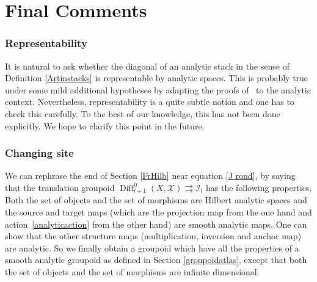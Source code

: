\documentclass[10pt]{amsart}
\let\mathcal\mathscr
\DeclareMathOperator{\Diff}{Diff}
\theoremstyle{plain}
\theoremstyle{definition}
\theoremstyle{remark}
\numberwithin{equation}{section}
\newcommand{\cI}{\mathcal{I}}
\begin{document}
\section{Final Comments}
\label{secfinalcomments}
\subsubsection*{Representability} It is natural to ask whether the diagonal of an analytic stack in the sense of Definition \ref{Artinstacks} is representable by analytic spaces. This is probably true under some mild additional hypotheses by adapting the proofs of~\cite[Props.\,15.5\,\&\,15.18]{BCEFFGK} to the analytic context. Nevertheless, representability is a quite subtle notion and one has to check this carefully. To the best of our knowledge, this has not been done explicitly. We hope to clarify this point in the future.

\subsubsection*{Changing site} We can rephrase the end of Section \ref{FrHilb} near equation \eqref{J rond}, by saying that the translation groupoid $\Diff^0_{l+1} (X,\mathcal X)\rightrightarrows \cI_l$ has the following properties. Both the set of objects and the set of morphisms are Hilbert analytic spaces and the source and target maps (which are the projection map from the one hand and action~\eqref{analyticaction} from the other hand) are smooth analytic maps. One can show that the other structure maps (multiplication, inversion and anchor map) are analytic. So we finally obtain a groupoid which have all the properties of a smooth analytic groupoid as defined in Section \ref{groupoidatlas}, except that both the set of objects and the set of morphisms are infinite dimensional.
\end{document}
